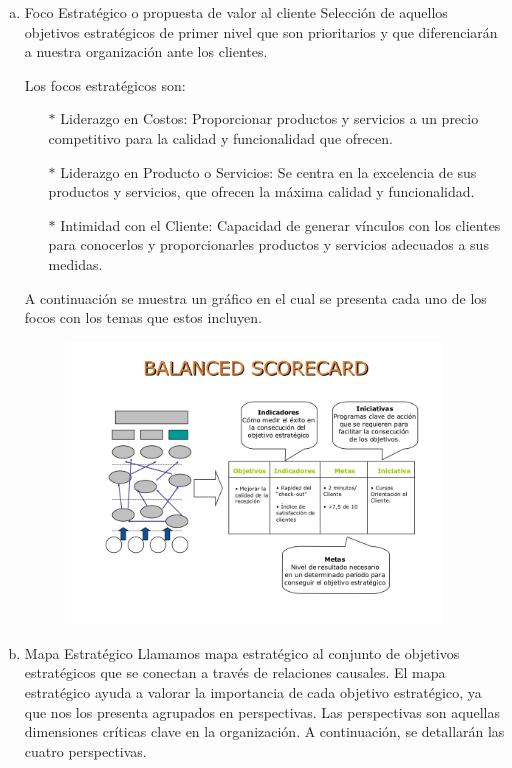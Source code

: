 	\begin{enumerate}[a)]
       	 \item Foco Estratégico o propuesta de valor al cliente
		Selección de aquellos objetivos estratégicos de primer nivel que son prioritarios y que diferenciarán a nuestra organización ante los clientes.

Los focos estratégicos son:

		\begin{itemize}

 		\item[$*$] Liderazgo en Costos: Proporcionar productos y servicios a un precio competitivo para la calidad y funcionalidad que ofrecen.
		\item[$*$] Liderazgo en Producto o Servicios: Se centra en la excelencia de sus productos y servicios, que ofrecen la máxima calidad y funcionalidad.
		\item[$*$] Intimidad con el Cliente: Capacidad de generar vínculos con los clientes para conocerlos y proporcionarles productos y servicios adecuados a sus medidas.

		\end{itemize}

	A continuación se muestra un gráfico en el cual se presenta cada uno de los focos con los temas que estos incluyen.

			\begin{figure}[htb]
				\begin{center}
					\includegraphics[width=10cm]{./Imagenes/2}
				\end{center}
			\end{figure}


        \item Mapa Estratégico
	Llamamos mapa estratégico al conjunto de objetivos estratégicos que se conectan a través de relaciones causales.
El mapa estratégico ayuda a valorar la importancia de cada objetivo estratégico, ya que nos los presenta agrupados en perspectivas. Las perspectivas son aquellas dimensiones críticas clave en la organización. A continuación, se detallarán las cuatro perspectivas.


\end{enumerate}

